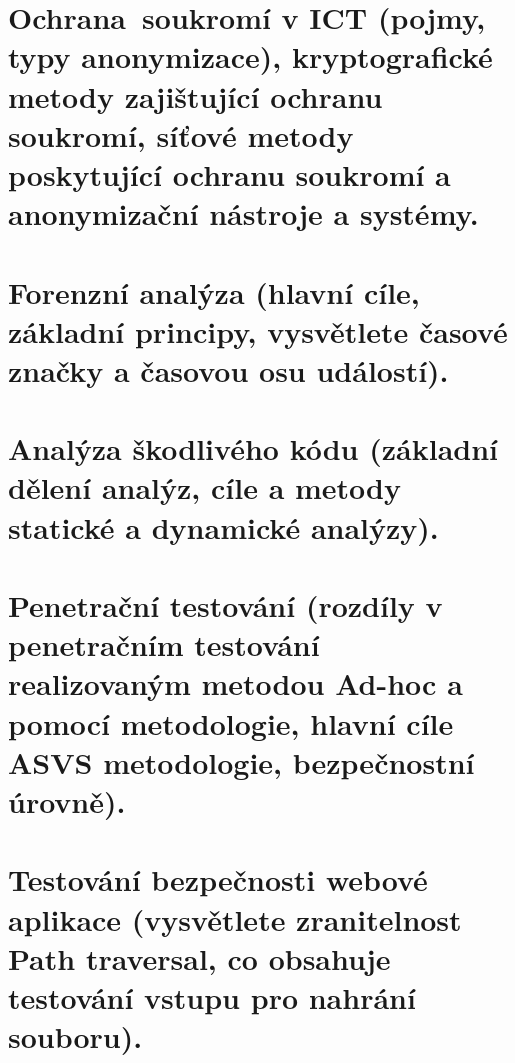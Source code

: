 \clearpage
\section{Ochrana~soukromí v ICT (pojmy, typy anonymizace), kryptografické metody zajištující ochranu soukromí, síťové metody poskytující ochranu soukromí a anonymizační nástroje a systémy.}



\clearpage
\section{Forenzní analýza (hlavní cíle, základní principy, vysvětlete časové značky a časovou osu událostí).}



\clearpage
\section{Analýza škodlivého kódu (základní dělení analýz, cíle a metody statické a dynamické analýzy).}



\clearpage
\section{Penetrační testování (rozdíly v penetračním testování realizovaným metodou Ad-hoc a pomocí metodologie, hlavní cíle ASVS metodologie, bezpečnostní úrovně).}



\clearpage
\section{Testování bezpečnosti webové aplikace (vysvětlete zranitelnost Path traversal, co obsahuje testování vstupu pro nahrání souboru).}



